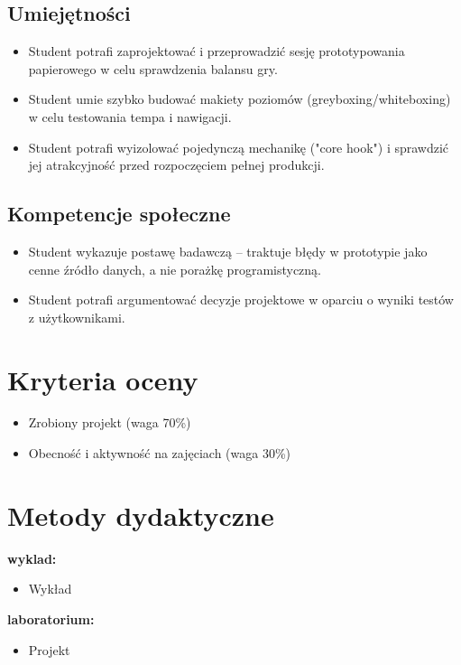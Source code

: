 \documentclass[12pt, a4paper]{article}
\begin{document}
\subsection*{Umiejętności}
\begin{itemize}
  \item Student potrafi zaprojektować i przeprowadzić sesję prototypowania papierowego w celu sprawdzenia balansu gry.
  \item Student umie szybko budować makiety poziomów (greyboxing/whiteboxing) w celu testowania tempa i nawigacji.
  \item Student potrafi wyizolować pojedynczą mechanikę ("core hook") i sprawdzić jej atrakcyjność przed rozpoczęciem pełnej produkcji.
\end{itemize}

\subsection*{Kompetencje społeczne}
\begin{itemize}
  \item Student wykazuje postawę badawczą – traktuje błędy w prototypie jako cenne źródło danych, a nie porażkę programistyczną.
  \item Student potrafi argumentować decyzje projektowe w oparciu o wyniki testów z użytkownikami.
\end{itemize}

\section{Kryteria oceny}

\begin{itemize}
  \item Zrobiony projekt (waga 70\%)
  \item Obecność i aktywność na zajęciach (waga 30\%)
\end{itemize}

\section{Metody dydaktyczne}

\textbf{wyklad:}
\begin{itemize}
  \item Wykład
\end{itemize}
\vspace{4pt}
\textbf{laboratorium:}
\begin{itemize}
  \item Projekt
\end{itemize}
\vspace{4pt}
\end{document}
